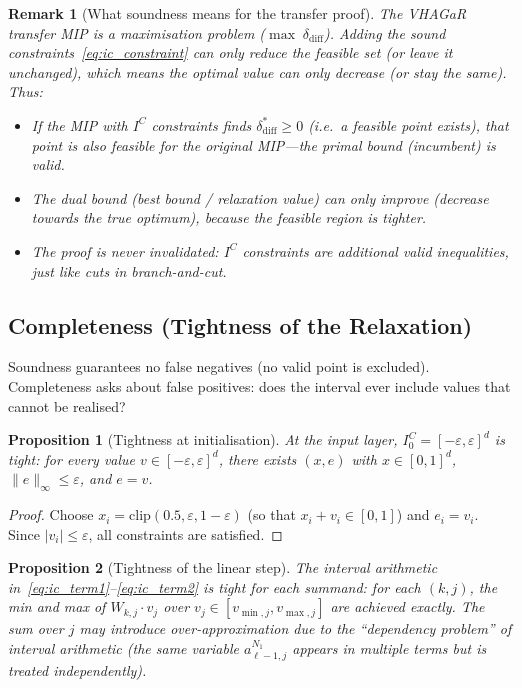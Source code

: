\documentclass[11pt]{article}
\newcommand{\eps}{\varepsilon}
\newcommand{\layerl}{\ell}
\newtheorem{proposition}{Proposition}
\newtheorem{remark}{Remark}
\begin{document}
\begin{remark}[What soundness means for the transfer proof]
The VHAGaR transfer MIP is a \emph{maximisation} problem ($\max\;\delta_{\mathrm{diff}}$).
Adding the sound constraints~\eqref{eq:ic_constraint} can only \emph{reduce}
the feasible set (or leave it unchanged), which means the optimal value
can only decrease (or stay the same). Thus:
\begin{itemize}
    \item If the MIP with $I^C$ constraints finds $\delta_{\mathrm{diff}}^* \ge 0$
          (i.e.\ a feasible point exists), that point is also feasible for the
          original MIP---the \emph{primal bound} (incumbent) is valid.
    \item The \emph{dual bound} (best bound / relaxation value) can only improve
          (decrease towards the true optimum), because the feasible region is tighter.
    \item The proof is never invalidated: $I^C$ constraints are additional
          valid inequalities, just like cuts in branch-and-cut.
\end{itemize}
\end{remark}

\subsection{Completeness (Tightness of the Relaxation)}
\label{sec:composed:completeness}

Soundness guarantees no false negatives (no valid point is excluded).
Completeness asks about false positives: does the interval ever include
values that cannot be realised?

\begin{proposition}[Tightness at initialisation]
\label{prop:tight_init}
At the input layer, $I^C_0 = [-\eps, \eps]^d$ is \emph{tight}: for every value
$v \in [-\eps, \eps]^d$, there exists $(x, e)$ with $x \in [0,1]^d$, $\|e\|_\infty \le \eps$,
and $e = v$.
\end{proposition}
\begin{proof}
Choose $x_i = \mathrm{clip}(0.5, \eps, 1-\eps)$ (so that $x_i + v_i \in [0,1]$)
and $e_i = v_i$. Since $|v_i| \le \eps$, all constraints are satisfied.
\end{proof}

\begin{proposition}[Tightness of the linear step]
\label{prop:tight_linear}
The interval arithmetic in~\eqref{eq:ic_term1}--\eqref{eq:ic_term2} is
\emph{tight for each summand}: for each $(k, j)$, the min and max of
$W_{k,j} \cdot v_j$ over $v_j \in [v_{\min,j}, v_{\max,j}]$ are achieved exactly.
The sum over $j$ may introduce over-approximation due to the ``dependency
problem'' of interval arithmetic (the same variable $a^{N_1}_{\layerl-1,j}$
appears in multiple terms but is treated independently).
\end{proposition}
\end{document}
